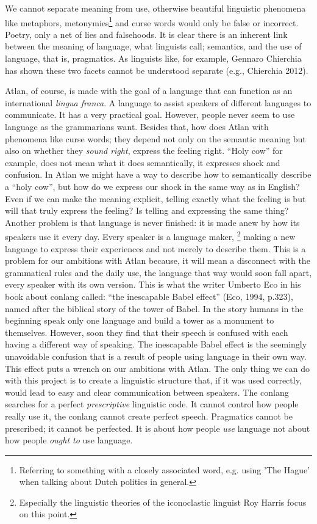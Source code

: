 We cannot separate meaning from use, otherwise beautiful linguistic phenomena like metaphors, metonymies\footnote{Referring to something with a closely associated word, e.g. using 'The Hague' when talking about Dutch politics in general.} and curse words would only be false or incorrect. Poetry, only a net of lies and falsehoods. It is clear there is an inherent link between the meaning of language, what linguists call; semantics, and the use of language, that is, pragmatics. As linguists like, for example, Gennaro Chierchia has shown these two facets cannot be understood separate (e.g., Chierchia 2012).  

Atlan, of course, is made with the goal of a language that can function as an international {\it lingua franca}. A language to assist speakers of different languages to communicate. It has a very practical goal. However, people never seem to use language as the grammarians want. Besides that, how does Atlan with phenomena like curse words; they depend not only on the semantic meaning but also on whether they {\it sound right}, express the feeling right. “Holy cow” for example, does not mean what it does semantically, it expresses shock and confusion. In Atlan we might have a way to describe how to semantically describe a “holy cow”, but how do we express our shock in the same way as in English? Even if we can make the meaning explicit, telling exactly what the feeling is but will that truly express the feeling? Is telling and expressing the same thing? Another problem is that language is never finished: it is made anew by how its speakers use it every day. Every speaker is a language maker, \footnote{Especially the linguistic theories of the iconoclastic linguist Roy Harris focus on this point.} making a new language to express their experiences and not merely to describe them. This is a problem for our ambitions with Atlan because, it will mean a disconnect with the grammatical rules and the daily use, the language that way would soon fall apart, every speaker with its own version. This is what the writer Umberto Eco in his book about conlang called: “the inescapable Babel effect” (Eco, 1994, p.323), named after the biblical story of the tower of Babel. In the story humans in the beginning speak only one language and build a tower as a monument to themselves. However, soon they find that their speech is confused with each having a different way of speaking. The inescapable Babel effect is the seemingly unavoidable confusion that is a result of people using language in their own way. This effect puts a wrench on our ambitions with Atlan. The only thing we can do with this project is to create a linguistic structure that, if it was used correctly, would lead to easy and clear communication between speakers. The conlang searches for a perfect \textit{prescriptive} linguistic code. It cannot control how people really use it, the conlang cannot create perfect speech. Pragmatics cannot be prescribed; it cannot be perfected. It is about how people \textit{use} language not about how people \textit{ought to} use language.  

